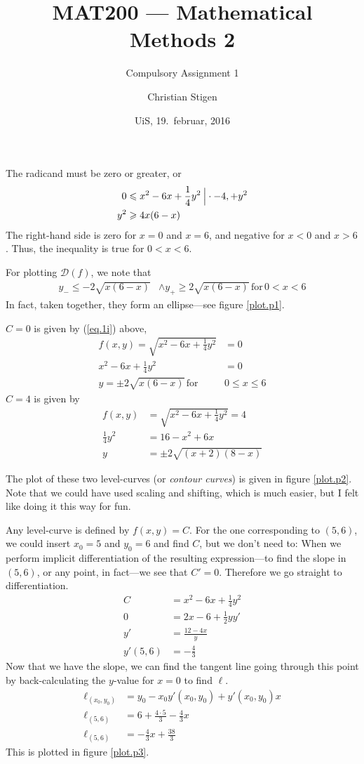 \documentclass[a4paper,norsk,12pt]{article}
\title{MAT200 --- Mathematical Methods 2}
\subtitle{Compulsory Assignment 1}
\author{Christian Stigen}
\date{UiS, 19.~februar, 2016}
\begin{document}
\maketitle
{}
The radicand must be zero or greater, or
\begin{align*}
  0 & \leqslant x^2-6x+\frac{1}{4}y^2 \> \Big{|} \cdot-4, +y^2 \\
  y^2 & \geqslant 4x(6-x)
\end{align*}
The right-hand side is zero for $x=0$ and $x=6$, and negative for $x<0$
and $x>6$. Thus, the inequality is true for $0 < x < 6$.

For plotting $\mathcal{D}(f)$, we note that
  \begin{align}
    y_{-} \leqslant -2\sqrt{x(6-x)} & \wedge y_{+} \geqslant 2\sqrt{x(6-x)}
    \,\text{for}\, 0<x<6 \label{eq.1i}
  \end{align}
In fact, taken together, they form an ellipse---see figure \vref{plot.p1}.


$C=0$ is given by (\ref{eq.1i}) above,
\begin{align*}
  f(x,y) = \sqrt{x^2 - 6x + \frac{1}{4}y^2} &= 0\\
  x^2 - 6x + \frac{1}{4}y^2 &= 0\\
  y = \pm2\sqrt{x(6-x)} \, \text{for} \, &0 \leqslant x \leqslant 6
\end{align*}
$C=4$ is given by
\begin{align*}
  f(x,y) &= \sqrt{x^2 - 6x + \frac{1}{4}y^2} = 4\\
  \frac{1}{4}y^2 &= 16 - x^2 + 6x\\
  y &= \pm2\sqrt{(x+2)(8-x)}
\end{align*}

The plot of these two level-curves (or \textit{contour curves}) is given in
figure \vref{plot.p2}. Note that we could have used scaling and shifting, which
is much easier, but I felt like doing it this way for fun.

Any level-curve is defined by $f(x,y)=C$. For the one corresponding to $(5,6)$,
we could insert $x_0=5$ and $y_0=6$ and find $C$, but we don't need to: When we
perform implicit differentiation of the resulting expression---to find the
slope in $(5,6)$, or any point, in fact---we see that $C'=0$. Therefore we go
straight to differentiation.
\begin{align*}
  C &= x^2 - 6x + \frac{1}{4}y^2 \\
  0 &= 2x - 6 + \frac{1}{2}yy' \\
  y' &= \frac{12-4x}{y} \\
  y'(5,6) &= -\frac{4}{3}
\end{align*}
Now that we have the slope, we can find the tangent line going through this
point by back-calculating the $y$-value for $x=0$ to find $\ell$.
\begin{align*}
  \ell_{(x_0, y_0)} &= y_0 - x_0y'(x_0,y_0) + y'(x_0,y_0)x \\
  \ell_{(5,6)} &= 6+\frac{4\cdot5}{3} -\frac{4}{3}x \\
  \ell_{(5,6)} &= -\frac{4}{3}x +\frac{38}{3}
\end{align*}
This is plotted in figure \vref{plot.p3}.
\end{document}
